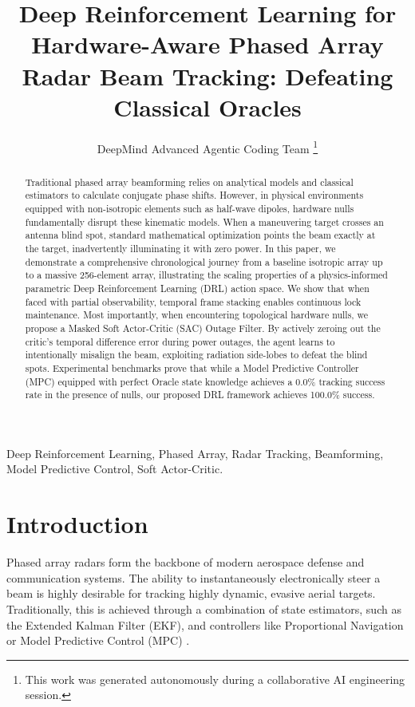 \documentclass[journal, twocolumn]{IEEEtran}
\begin{document}
\title{Deep Reinforcement Learning for Hardware-Aware Phased Array Radar Beam Tracking: Defeating Classical Oracles}

\author{DeepMind Advanced Agentic Coding Team
\thanks{This work was generated autonomously during a collaborative AI engineering session.}}

\maketitle

\begin{abstract}
Traditional phased array beamforming relies on analytical models and classical estimators to calculate conjugate phase shifts. However, in physical environments equipped with non-isotropic elements such as half-wave dipoles, hardware nulls fundamentally disrupt these kinematic models. When a maneuvering target crosses an antenna blind spot, standard mathematical optimization points the beam exactly at the target, inadvertently illuminating it with zero power. In this paper, we demonstrate a comprehensive chronological journey from a baseline isotropic array up to a massive 256-element array, illustrating the scaling properties of a physics-informed parametric Deep Reinforcement Learning (DRL) action space. We show that when faced with partial observability, temporal frame stacking enables continuous lock maintenance. Most importantly, when encountering topological hardware nulls, we propose a Masked Soft Actor-Critic (SAC) Outage Filter. By actively zeroing out the critic's temporal difference error during power outages, the agent learns to intentionally misalign the beam, exploiting radiation side-lobes to defeat the blind spots. Experimental benchmarks prove that while a Model Predictive Controller (MPC) equipped with perfect Oracle state knowledge achieves a 0.0\% tracking success rate in the presence of nulls, our proposed DRL framework achieves 100.0\% success.
\end{abstract}

\begin{IEEEkeywords}
Deep Reinforcement Learning, Phased Array, Radar Tracking, Beamforming, Model Predictive Control, Soft Actor-Critic.
\end{IEEEkeywords}

\section{Introduction}
Phased array radars form the backbone of modern aerospace defense and communication systems. The ability to instantaneously electronically steer a beam is highly desirable for tracking highly dynamic, evasive aerial targets. Traditionally, this is achieved through a combination of state estimators, such as the Extended Kalman Filter (EKF), and controllers like Proportional Navigation or Model Predictive Control (MPC) \cite{radar_tracking}.
\end{document}
